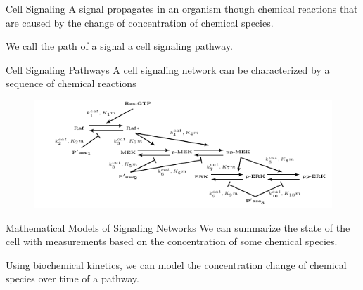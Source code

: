 \documentclass{beamer}
\begin{document}
\begin{frame}{Cell Signaling}
A signal propagates in an organism though chemical reactions that are
caused by the change of concentration of chemical species.

\pause
We call the path of a signal a \alert{cell signaling pathway}.
\end{frame}


\begin{frame}{Cell Signaling Pathways}
A cell signaling network can be characterized by a sequence of chemical 
reactions 
\begin{figure}
    \includegraphics[scale=1.2, trim={.5cm 0 0 0}, clip]{introduction/csp_example.pdf}
\end{figure}
\end{frame}

\begin{frame}{Mathematical Models of Signaling Networks}
We can summarize the state of the cell with measurements based on the 
concentration of some chemical species.
\pause

Using biochemical kinetics, \alert{we can model the 
concentration change of chemical species over time} of a pathway.
\end{frame}




\end{document}
